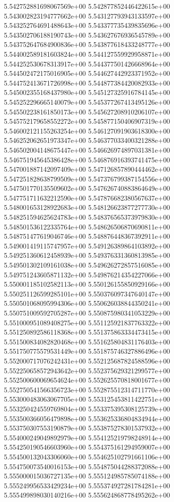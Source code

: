 5.542752881698067569e+00
5.542877852446422615e+00
5.543002823194777662e+00
5.543127793943133597e+00
5.543252764691488643e+00
5.543377735439835696e+00
5.543502706188190743e+00
5.543627676936545789e+00
5.543752647684900836e+00
5.543877618433248777e+00
5.544002589181603824e+00
5.544127559929958871e+00
5.544252530678313917e+00
5.544377501426668964e+00
5.544502472175016905e+00
5.544627442923371952e+00
5.544752413671726998e+00
5.544877384420082933e+00
5.545002355168437980e+00
5.545127325916784145e+00
5.545252296665140079e+00
5.545377267413495126e+00
5.545502238161850173e+00
5.545627208910206107e+00
5.545752179658552272e+00
5.545877150406907319e+00
5.546002121155263254e+00
5.546127091903618300e+00
5.546252062651973347e+00
5.546377033400321288e+00
5.546502004148675447e+00
5.546626974897031381e+00
5.546751945645386428e+00
5.546876916393741475e+00
5.547001887142097409e+00
5.547126857890444462e+00
5.547251828638799509e+00
5.547376799387154556e+00
5.547501770135509602e+00
5.547626740883864649e+00
5.547751711632212590e+00
5.547876682380567637e+00
5.548001653128922683e+00
5.548126623877277730e+00
5.548251594625624783e+00
5.548376565373979830e+00
5.548501536122335764e+00
5.548626506870690811e+00
5.548751477619046746e+00
5.548876448367392911e+00
5.549001419115747957e+00
5.549126389864103892e+00
5.549251360612458939e+00
5.549376331360813985e+00
5.549501302109161038e+00
5.549626272857516085e+00
5.549751243605871132e+00
5.549876214354227066e+00
5.550001185102582113e+00
5.550126155850929166e+00
5.550251126599285101e+00
5.550376097347640147e+00
5.550501068095994306e+00
5.550626038844350241e+00
5.550751009592705287e+00
5.550875980341053229e+00
5.551000951089408275e+00
5.551125921837763322e+00
5.551250892586118368e+00
5.551375863334473415e+00
5.551500834082820468e+00
5.551625804831176403e+00
5.551750775579531449e+00
5.551875746327886496e+00
5.552000717076242431e+00
5.552125687824588596e+00
5.552250658572943642e+00
5.552375629321299577e+00
5.552500600069654624e+00
5.552625570818001677e+00
5.552750541566356723e+00
5.552875512314711770e+00
5.553000483063067705e+00
5.553125453811422751e+00
5.553250424559769804e+00
5.553375395308125739e+00
5.553500366056479898e+00
5.553625336804834944e+00
5.553750307553190879e+00
5.553875278301537932e+00
5.554000249049892979e+00
5.554125219798248914e+00
5.554250190546603960e+00
5.554375161294959007e+00
5.554500132043306060e+00
5.554625102791661106e+00
5.554750073540016153e+00
5.554875044288372088e+00
5.555000015036727135e+00
5.555124985785074188e+00
5.555249956533429234e+00
5.555374927281784281e+00
5.555499898030140216e+00
5.555624868778495262e+00
